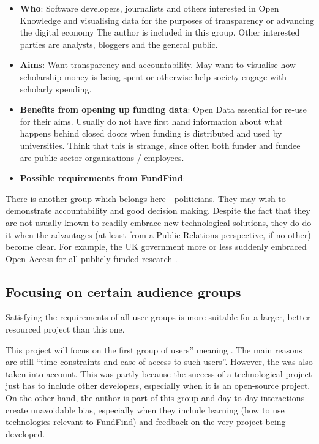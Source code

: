\begin{itemize}
 \item \textbf{Who}: Software developers, journalists and others interested in Open Knowledge and visualising data for the purposes of transparency or advancing the digital economy \cite{okfn-vision} The author is included in this group. Other interested parties are analysts, bloggers and the general public.
 \item \textbf{Aims}: Want transparency and accountability. May want to visualise how scholarship money is being spent or otherwise help society engage with scholarly spending.
 \item \textbf{Benefits from opening up funding data}: Open Data essential for re-use for their aims. Usually do not have first hand information about what happens behind closed doors when funding is distributed and used by universities. Think that this is strange, since often both funder and fundee are public sector organisations / employees.
 \item \textbf{Possible requirements from FundFind}: 
\end{itemize}

There is another group which belongs here - politicians. They may wish to demonstrate accountability and good decision making. Despite the fact that they are not usually known to readily embrace new technological solutions, they do do it when the advantages (at least from a Public Relations perspective, if no other) become clear. For example, the UK government more or less suddenly embraced Open Access for all publicly funded research \cite{guardian-ukgov-oa2014}.

\subsection{Focusing on certain audience groups}
\label{focus-groups}
Satisfying the requirements of all user groups is more suitable for a larger, better-resourced project than this one.

This project will focus on the first group of users'' meaning . The main reasons are still ``time constraints and ease of access to such users''. However, the  was also taken into account. This was partly because the success of a technological project just has to include other developers, especially when it is an open-source project. On the other hand, the author is part of this group and day-to-day interactions create unavoidable bias, especially when they include learning (how to use technologies relevant to FundFind) and feedback on the very project being developed.

